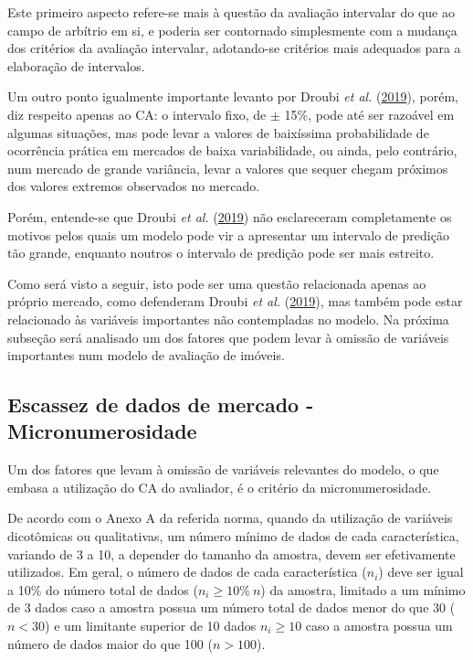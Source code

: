 \documentclass[
  a4paper, 11pt]{article}
\begin{document}
Este primeiro aspecto refere-se mais à questão da avaliação intervalar
do que ao campo de arbítrio em si, e poderia ser contornado simplesmente
com a mudança dos critérios da avaliação intervalar, adotando-se
critérios mais adequados para a elaboração de intervalos.

Um outro ponto igualmente importante levanto por Droubi \emph{et al.}
(\protect\hyperlink{ref-droubi2019}{2019}), porém, diz respeito apenas
ao CA: o intervalo fixo, de \(\pm\) 15\%, pode até ser razoável em
algumas situações, mas pode levar a valores de baixíssima probabilidade
de ocorrência prática em mercados de baixa variabilidade, ou ainda, pelo
contrário, num mercado de grande variância, levar a valores que sequer
chegam próximos dos valores extremos observados no mercado.

Porém, entende-se que Droubi \emph{et al.}
(\protect\hyperlink{ref-droubi2019}{2019}) não esclareceram
completamente os motivos pelos quais um modelo pode vir a apresentar um
intervalo de predição tão grande, enquanto noutros o intervalo de
predição pode ser mais estreito.

Como será visto a seguir, isto pode ser uma questão relacionada apenas
ao próprio mercado, como defenderam Droubi \emph{et al.}
(\protect\hyperlink{ref-droubi2019}{2019}), mas também pode estar
relacionado às variáveis importantes não contempladas no modelo. Na
próxima subseção será analisado um dos fatores que podem levar à omissão
de variáveis importantes num modelo de avaliação de imóveis.

\hypertarget{escassez-de-dados-de-mercado---micronumerosidade}{%
\subsection{Escassez de dados de mercado -
Micronumerosidade}\label{escassez-de-dados-de-mercado---micronumerosidade}}

Um dos fatores que levam à omissão de variáveis relevantes do modelo, o
que embasa a utilização do CA do avaliador, é o critério da
micronumerosidade.

De acordo com o Anexo A da referida norma, quando da utilização de
variáveis dicotômicas ou qualitativas, um número mínimo de dados de cada
característica, variando de 3 a 10, a depender do tamanho da amostra,
devem ser efetivamente utilizados. Em geral, o número de dados de cada
característica (\(n_i\)) deve ser igual a 10\% do número total de dados
(\(n_i \geq 10\% \ n\)) da amostra, limitado a um mínimo de 3 dados caso
a amostra possua um número total de dados menor do que 30 (\(n<30\)) e
um limitante superior de 10 dados \(n_i \geq 10\) caso a amostra possua
um número de dados maior do que 100 (\(n > 100\)).
\end{document}
